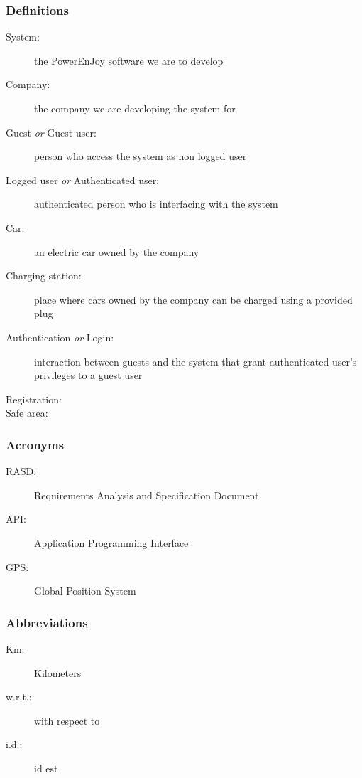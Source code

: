 	\subsubsection{Definitions}
	\begin{description}
		\item[System:]the PowerEnJoy software we are to develop
		\item[Company:] the company we are developing the system for
		\item[Guest \emph{or} Guest user:] person who access the system as non logged user
		\item[Logged user \emph{or} Authenticated user:] authenticated person who is interfacing with the system
		\item[Car:] an electric car owned by the company
		\item[Charging station:] place where cars owned by the company can be charged using a provided plug
		\item[Authentication \emph{or} Login:] interaction between guests and the system that grant authenticated user's privileges to a guest user
		\item[Registration:]
		\item[Safe area:]
	\end{description}
\subsubsection{Acronyms}
	\begin{description}
		\item [RASD:] Requirements Analysis and Specification Document
		\item [API:] Application Programming Interface
		\item [GPS:] Global Position System
	\end{description}
\subsubsection{Abbreviations}
	\begin{description}
		\item [Km:] Kilometers
		\item [w.r.t.:] with respect to
		\item [i.d.:] id est
	\end{description}